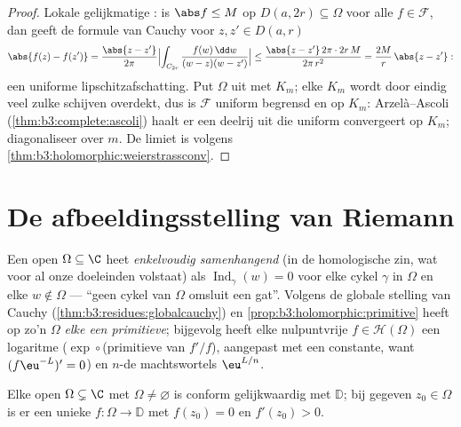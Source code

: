 \begin{proof}
Lokale gelijkmatige : is $\abs f \leq M$ op $D(a, 2r)
\subseteq \Omega$ voor alle $f \in \mathcal F$, dan geeft de
formule van Cauchy voor $z, z' \in D(a, r)$
\[
\abs{f(z) - f(z')} = \frac{\abs{z - z'}}{2\pi}
\Bigl|\int_{C_{2r}}\frac{f(w)\,\dd w}{(w-z)(w-z')}\Bigr|
\leq \frac{\abs{z - z'}\,2\pi\cdot2r\,M}{2\pi\,r^2}
= \frac{2M}{r}\,\abs{z - z'} :
\]
een uniforme lipschitzafschatting. Put $\Omega$ uit met 
$K_m$; elke $K_m$ wordt door eindig veel zulke schijven overdekt,
dus is $\mathcal F$ uniform begrensd en  op $K_m$:
Arzelà--Ascoli (\cref{thm:b3:complete:ascoli}) haalt er een
deelrij uit die uniform convergeert op $K_m$; diagonaliseer over
$m$. De limiet is  volgens
\cref{thm:b3:holomorphic:weierstrassconv}.
\end{proof}

\section{De afbeeldingsstelling van Riemann}

\begin{definition}\label{def:b3:conformal:simplyconnected}
Een open  $\Omega \subseteq \C$ heet
\emph{enkelvoudig samenhangend} (in de homologische zin, wat voor al onze doeleinden
volstaat) als $\operatorname{Ind}_\gamma(w) = 0$ voor elke cykel
$\gamma$ in $\Omega$ en elke $w \notin \Omega$ --- ``geen cykel
van $\Omega$ omsluit een gat''. Volgens de globale stelling van
Cauchy (\cref{thm:b3:residues:globalcauchy}) en
\cref{prop:b3:holomorphic:primitive} heeft op zo'n $\Omega$
\emph{elke  een primitieve}; bijgevolg heeft
elke nulpuntvrije $f \in \mathcal H(\Omega)$ een 
logaritme ($\exp\circ$(primitieve van $f'/f$), aangepast met een
constante, want $(f\eu^{-L})' = 0$) en  $n$-de
machtswortels $\eu^{L/n}$.
\end{definition}

\begin{theorem}
\label{thm:b3:conformal:rmt}
Elke  open $\Omega \subsetneq \C$ met
$\Omega \neq \varnothing$ is conform gelijkwaardig met $\mathbb
D$; bij gegeven $z_0 \in \Omega$ is er een unieke  $f
\colon \Omega \to \mathbb D$ met $f(z_0) = 0$ en $f'(z_0) >
0$.
\end{theorem}

